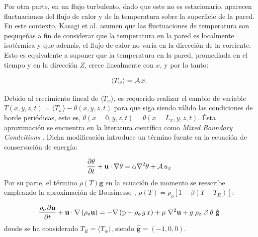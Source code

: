 Por otra parte, en un flujo turbulento, dado que este no es estacionario, aparecen fluctuaciones del flujo de calor y de la temperatura sobre la superficie de la pared. En este contexto, Kasagi et al. \cite{kasagi1992direct} asumen que las fluctuaciones de temperatura son pequqeñas a fin de considerar que la temperatura en la pared es localmente isotérmica y que además, el flujo de calor no varía en la dirección de la corriente. Esto es equivalente a suponer que la temperatura en la pared, promediada en el tiempo y en la dirección $Z$, crece linealmente con $x$, y por lo tanto: 

$$
\langle T_w \rangle = \mathcal{A} \hspace{0.5mm} x.
$$

Debido al crecimiento lineal de $\langle T_w \rangle$, es requerido realizar el cambio de variable $T(x,y,z,t) = \langle T_w \rangle - \theta(x,y,z,t)$ para que siga siendo válido las condiciones de borde periódicas, esto es, $\theta(x=0,y,z,t)=\theta(x=L_x,y,z,t)$. Ésta aproximación se encuentra en la literatura científica como \textit{Mixed Boundary Condcitions} \cite{straub2019influence}. Dicha modificación introduce un término fuente en la ecuación de conservación de energía:

\begin{equation}
\frac{ \partial \theta }{ \partial t } + \mathbf{u} \cdot \nabla \theta = \alpha \nabla^2 \theta + \mathcal{A} \hspace{0.5mm} u_x 
\label{eq:energy_pcb_source}
\end{equation}
Por su parte, el término $\rho(T) \mathbf{g}$ en la ecuación de momento se reescribe empleando la aproximación de Bousinessq \cite{incropera}, $\rho(T) = \rho_o \left[ 1 - \beta (T - T_R) \right]$:

\begin{equation}
\frac{ \rho_o \hspace{0.5mm} \partial \mathbf{u}}{\partial t} + \mathbf{u} \cdot \nabla  \left( \rho_o \mathbf{u} \right) = -\nabla \left( \text{p} + \rho_o \hspace{0.5mm} g \hspace{0.5mm} x \right) + \mu \hspace{1mm} {\nabla}^2 \mathbf{u}  + g \hspace{1mm} \rho_o \hspace{1mm} \beta \hspace{1mm} \theta \hspace{1mm} \mathbf{\hat{g}}   
\end{equation}
donde se ha considerado $T_R = \langle T_w \rangle$, siendo $\mathbf{\hat{g}}=(-1,0,0)$.

